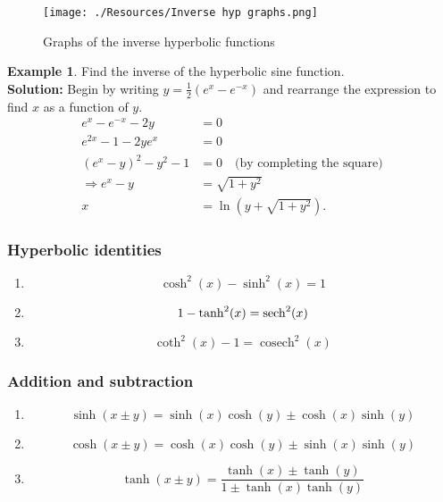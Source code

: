 \documentclass[12pt, a4paper]{article}
\newcommand{\f}[2]{\frac{#1}{#2}}
\newcommand{\imply}{\Rightarrow}
\DeclareMathOperator{\cosech}{cosech}
\theoremstyle{definition}
\newtheorem*{example}{Example}
\theoremstyle{plain}
\begin{document}
\begin{figure}[H]
\centering
\texttt{[image: ./Resources/Inverse hyp graphs.png]}
\caption{Graphs of the inverse hyperbolic functions}
\label{fig:inverse hyperbolic}
\end{figure}

\begin{example}
Find the inverse of the hyperbolic sine function. \\
\textbf{Solution:} Begin by writing $y=\f{1}{2}(e^{x}-e^{-x})$ and rearrange the expression to find $x$ as a function of $y.$ $$\begin{aligned}
e^x-e^{-x}-2y&=0 \\
e^{2x}-1-2ye^{x}&=0 \\
(e^x-y)^2-y^2-1&=0 \quad \text{(by completing the square)} \\
\imply e^x-y&=\sqrt{1+y^2} \\
x&=\ln(y+\sqrt{1+y^2}).
\end{aligned}$$
\end{example}

\subsubsection{Hyperbolic identities}

\begin{enumerate}
	
	\item $$\cosh^2(x)-\sinh^2(x)=1$$

	\item $$1-\tanh^2(x)=\sech^2(x)$$

	\item $$\coth^2(x)-1=\cosech^2(x)$$

\end{enumerate}

\subsubsection*{Addition and subtraction}

\begin{enumerate}
	
	\item $$\sinh(x\pm y)=\sinh(x)\cosh(y)\pm\cosh(x)\sinh(y)$$

	\item $$\cosh(x\pm y)=\cosh(x)\cosh(y)\pm\sinh(x)\sinh(y)$$

	\item $$\tanh(x\pm y)=\f{\tanh(x)\pm\tanh(y)}{1\pm\tanh(x)\tanh(y)}$$

\end{enumerate}
\end{document}
